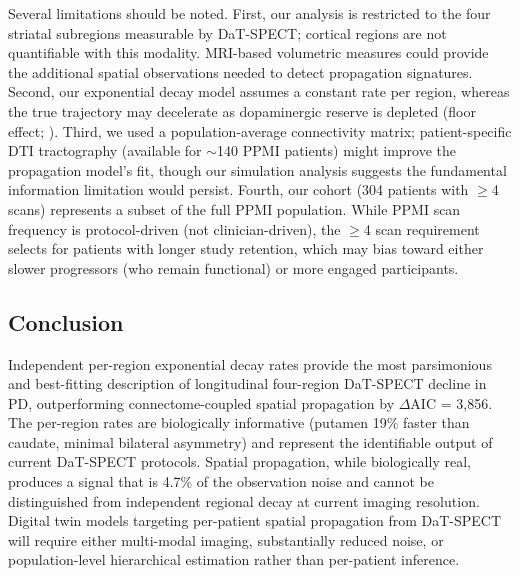 Several limitations should be noted. First, our analysis is restricted to the four striatal subregions measurable by DaT-SPECT; cortical regions are not quantifiable with this modality. MRI-based volumetric measures could provide the additional spatial observations needed to detect propagation signatures. Second, our exponential decay model assumes a constant rate per region, whereas the true trajectory may decelerate as dopaminergic reserve is depleted (floor effect; \cite{sung2016}). Third, we used a population-average connectivity matrix; patient-specific DTI tractography (available for $\sim$140 PPMI patients) might improve the propagation model's fit, though our simulation analysis suggests the fundamental information limitation would persist. Fourth, our cohort (304 patients with $\geq$4 scans) represents a subset of the full PPMI population. While PPMI scan frequency is protocol-driven (not clinician-driven), the $\geq$4 scan requirement selects for patients with longer study retention, which may bias toward either slower progressors (who remain functional) or more engaged participants.

\subsection{Conclusion}

Independent per-region exponential decay rates provide the most parsimonious and best-fitting description of longitudinal four-region DaT-SPECT decline in PD, outperforming connectome-coupled spatial propagation by $\Delta$AIC = 3,856. The per-region rates are biologically informative (putamen 19\% faster than caudate, minimal bilateral asymmetry) and represent the identifiable output of current DaT-SPECT protocols. Spatial propagation, while biologically real, produces a signal that is 4.7\% of the observation noise and cannot be distinguished from independent regional decay at current imaging resolution. Digital twin models targeting per-patient spatial propagation from DaT-SPECT will require either multi-modal imaging, substantially reduced noise, or population-level hierarchical estimation rather than per-patient inference.


